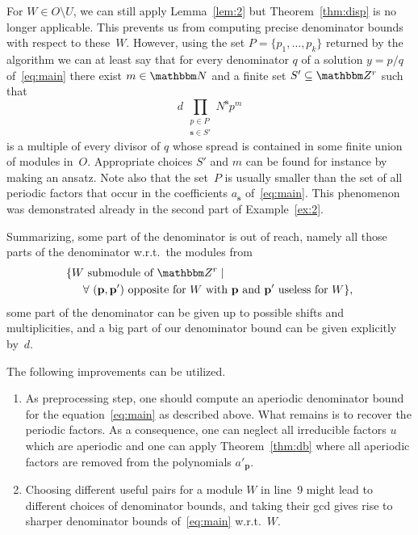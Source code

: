 \documentclass[a4paper]{sig-alternate}
\let\set\mathbbm
\def\vec#1{\mathbf{#1}}
\begin{document}
For $W\in O\setminus U$, we can still apply Lemma~\ref{lem:2} but
Theorem~\ref{thm:disp} is no longer applicable. This prevents us from computing
precise denominator bounds with respect to these~$W$. However, using the set
$P=\{p_1,\dots,p_k\}$ returned by the algorithm we can at least say that 
for every denominator $q$ of a solution $y=p/q$ of~\eqref{eq:main} there
exist $m\in\set N$ and a finite set $S'\subseteq\set Z^r$ such that
\begin{equation}
   d\,\prod_{\substack{p\in P\\ \vec s\in S'}}N^{\vec s}p^m
\end{equation}
is a multiple of every divisor of $q$ whose spread is contained in some finite
union of modules in~$O$. Appropriate choices $S'$ and $m$ can be found for instance by making an
ansatz. Note also that the set~$P$ is usually smaller than the set of all
periodic factors that occur in the coefficients $a_{\vec s}$
of~\eqref{eq:main}. This phenomenon was demonstrated already in the second part
of Example~\ref{ex:2}.



Summarizing, some part of the denominator is out of reach, namely all those parts of the denominator w.r.t.\ the modules from
\begin{align*}
\{&W\text{ submodule of }\set Z^r\mid\\
&\quad \forall\ (\vec p,\vec p') \text{ opposite for $W$ with $\vec p$ and $\vec p'$ useless for $W$}\},
\end{align*}
some part of the denominator can be given up to possible shifts and multiplicities, and a big part of our denominator bound can be given explicitly by~$d$.

The following improvements can be utilized.

\begin{enumerate}
\item As preprocessing step, one should compute an aperiodic denominator bound for the equation~\eqref{eq:main} as described above. What remains is to recover the periodic factors. As a consequence, one can neglect all irreducible factors $u$ which are aperiodic and one can apply Theorem~\ref{thm:db} where all aperiodic factors are removed from the polynomials $a'_{\vec{p}}$.

\item Choosing different useful pairs for a module $W$ in line~9 might lead to different choices of denominator bounds, and taking their gcd gives rise to sharper denominator bounds of~\eqref{eq:main} w.r.t.\ $W$.
\end{enumerate}
\end{document}
